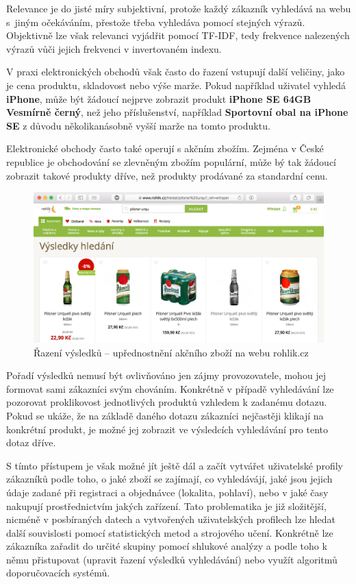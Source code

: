 \documentclass[FM,DP]{tulthesis}
\begin{document}
Relevance je do jisté míry subjektivní, protože každý zákazník vyhledává na webu
s~jiným očekáváním, přestože třeba vyhledáva pomocí stejných výrazů. Objektivně lze však
relevanci vyjádřit pomocí TF-IDF, tedy frekvence nalezených výrazů vůči jejich frekvenci
v invertovaném indexu. 

V praxi elektronických obchodů však často do řazení
vstupují další veličiny, jako je cena produktu, skladovost nebo výše marže.
Pokud například uživatel vyhledá \textbf{iPhone}, může být žádoucí nejprve zobrazit
produkt \textbf{iPhone SE 64GB Vesmírně černý}, než jeho příslušenství, například
\textbf{Sportovní obal na iPhone SE} z důvodu několikanásobně vyšší marže na tomto produktu.

Elektronické obchody často také operují s akčním zbožím. Zejména v České republice je
obchodování se zlevněným zbožím populární, může bý tak žádoucí zobrazit takové produkty
dříve, než produkty prodávané za standardní cenu.

\begin{figure}[h]
\center
\includegraphics[width=\textwidth]{relevance.png}
\caption[Řazení výsledků]{Řazení výsledků -- upřednostnění akčního zboží na webu rohlik.cz}
\label{relevance}
\end{figure}

Pořadí výsledků nemusí být ovlivňováno jen zájmy provozovatele, mohou jej formovat
sami zákazníci svým chováním. Konkrétně v případě vyhledávání lze pozorovat proklikovost
jednotlivých produktů vzhledem k zadanému dotazu. Pokud se ukáže, že na základě
daného dotazu zákazníci nejčastěji klikají na konkrétní produkt, je možné jej zobrazit 
ve výsledcích vyhledávání pro tento dotaz dříve. 

S tímto přístupem je však možné jít ještě dál a začít vytvářet uživatelské profily zákazníků podle toho, 
o jaké zboží se zajímají, co vyhledávájí, jaké jsou jejich údaje zadané při registraci a objednávce 
(lokalita, pohlaví), nebo v jaké časy nakupují prostřednictvím jakých zařízení. Tato problematika je již
složitější, nicméně v posbíraných datech a vytvořených uživatelských profilech lze hledat další 
souvislosti pomocí statistických metod a strojového učení. Konkrétně lze zákazníka zařadit do určité 
skupiny pomocí shlukové analýzy a podle toho k němu přistupovat (upravit řazení výsledků vyhledávání) 
nebo využít algoritmů doporučovacích systémů.
\end{document}
